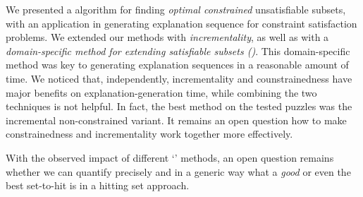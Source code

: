 We presented a \hitsetbased algorithm for finding \textit{optimal constrained} unsatisfiable subsets, with an application in generating explanation sequence for constraint satisfaction problems.
We extended our methods with \emph{incrementality}, as well as with a \emph{domain-specific method for extending satisfiable subsets (\grow)}. 
This domain-specific \grow method was key to generating explanation sequences in a reasonable amount of time.
We noticed that, independently, incrementality and counstrainedness have major benefits on explanation-generation time, while combining the two techniques is not helpful. In fact, the best method on the tested puzzles was the incremental non-constrained variant. 
It remains an open question how to make constrainedness and incrementality work together more effectively. 




With the observed impact of different `\grow' methods, an open question remains whether we can quantify precisely and in a generic way what a \textit{good} or even the best set-to-hit is in a hitting set approach. 

